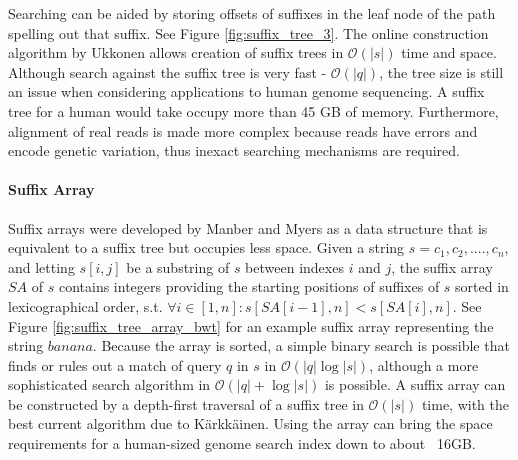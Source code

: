 Searching can be aided by storing offsets of suffixes in the leaf node of the path spelling out that suffix. See Figure \ref{fig:suffix_tree_3}. The online construction algorithm by Ukkonen\autocite{ukkonen1995line} allows creation of suffix trees in $\mathcal{O}(|s|)$ time and space. Although search against the suffix tree is very fast - $\mathcal{O}(|q|)$, the tree size is still an issue when considering applications to human genome sequencing. A suffix tree for a human would take occupy more than 45 GB of memory\autocite{langmead_teaching}. Furthermore, alignment of real reads is made more complex because reads have errors and encode genetic variation, thus inexact searching mechanisms are required.

\paragraph{Suffix Array}

Suffix arrays were developed by Manber and Myers\autocite{manber1993suffix} as a data structure that is equivalent to a suffix tree but occupies less space. Given a string $s = c_1,c_2,....,c_n$, and letting $s[i,j]$ be a substring of $s$ between indexes $i$ and $j$, the suffix array $SA$ of $s$ contains integers providing the starting positions of suffixes of $s$ sorted in lexicographical order, s.t. $\forall i \in [1,n]: s[SA[i-1],n] < s[SA[i],n]$. See Figure \ref{fig:suffix_tree_array_bwt} for an example suffix array representing the string $banana$. Because the array is sorted, a simple binary search is possible that finds or rules out a match of query $q$ in $s$ in $\mathcal{O}(|q|\log{|s|})$, although a more sophisticated search algorithm in $\mathcal{O}(|q| + \log{|s|})$ is possible\autocite{manber1993suffix}. A suffix array can be constructed by a depth-first traversal of a suffix tree in $\mathcal{O}(|s|)$ time, with the best current algorithm due to Kärkkäinen\autocite{karkkainen2003simple}. Using the array can bring the space requirements for a human-sized genome search index down to about ~16GB\autocite{langmead_teaching}.


